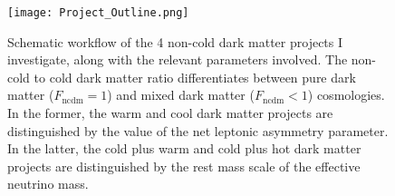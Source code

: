 \begin{figure}
\begin{center}
\texttt{[image: Project\_Outline.png]}
\caption{Schematic workflow of the 4 non-cold dark matter projects I investigate, along with the relevant parameters involved. The non-cold to cold dark matter ratio differentiates between pure dark matter ($F_{\mathrm{ncdm}} = 1$) and mixed dark matter ($F_{\mathrm{ncdm}} < 1$) cosmologies. In the former, the warm and cool dark matter projects are distinguished by the value of the net leptonic asymmetry parameter. In the latter, the cold plus warm and cold plus hot dark matter projects are distinguished by the rest mass scale of the effective neutrino mass.}
\label{fig:outline}
\end{center}
\end{figure}
